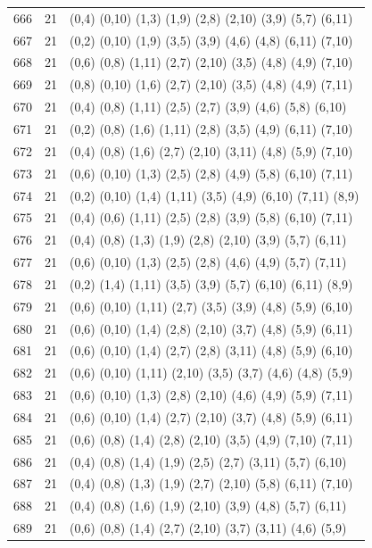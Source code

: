 {\begin{longtable}{lll}
666 & 21 & (0,4) (0,10) (1,3) (1,9) (2,8) (2,10) (3,9) (5,7) (6,11) \\
667 & 21 & (0,2) (0,10) (1,9) (3,5) (3,9) (4,6) (4,8) (6,11) (7,10) \\
668 & 21 & (0,6) (0,8) (1,11) (2,7) (2,10) (3,5) (4,8) (4,9) (7,10) \\
669 & 21 & (0,8) (0,10) (1,6) (2,7) (2,10) (3,5) (4,8) (4,9) (7,11) \\
670 & 21 & (0,4) (0,8) (1,11) (2,5) (2,7) (3,9) (4,6) (5,8) (6,10) \\
671 & 21 & (0,2) (0,8) (1,6) (1,11) (2,8) (3,5) (4,9) (6,11) (7,10) \\
672 & 21 & (0,4) (0,8) (1,6) (2,7) (2,10) (3,11) (4,8) (5,9) (7,10) \\
673 & 21 & (0,6) (0,10) (1,3) (2,5) (2,8) (4,9) (5,8) (6,10) (7,11) \\
674 & 21 & (0,2) (0,10) (1,4) (1,11) (3,5) (4,9) (6,10) (7,11) (8,9) \\
675 & 21 & (0,4) (0,6) (1,11) (2,5) (2,8) (3,9) (5,8) (6,10) (7,11) \\
676 & 21 & (0,4) (0,8) (1,3) (1,9) (2,8) (2,10) (3,9) (5,7) (6,11) \\
677 & 21 & (0,6) (0,10) (1,3) (2,5) (2,8) (4,6) (4,9) (5,7) (7,11) \\
678 & 21 & (0,2) (1,4) (1,11) (3,5) (3,9) (5,7) (6,10) (6,11) (8,9) \\
679 & 21 & (0,6) (0,10) (1,11) (2,7) (3,5) (3,9) (4,8) (5,9) (6,10) \\
680 & 21 & (0,6) (0,10) (1,4) (2,8) (2,10) (3,7) (4,8) (5,9) (6,11) \\
681 & 21 & (0,6) (0,10) (1,4) (2,7) (2,8) (3,11) (4,8) (5,9) (6,10) \\
682 & 21 & (0,6) (0,10) (1,11) (2,10) (3,5) (3,7) (4,6) (4,8) (5,9) \\
683 & 21 & (0,6) (0,10) (1,3) (2,8) (2,10) (4,6) (4,9) (5,9) (7,11) \\
684 & 21 & (0,6) (0,10) (1,4) (2,7) (2,10) (3,7) (4,8) (5,9) (6,11) \\
685 & 21 & (0,6) (0,8) (1,4) (2,8) (2,10) (3,5) (4,9) (7,10) (7,11) \\
686 & 21 & (0,4) (0,8) (1,4) (1,9) (2,5) (2,7) (3,11) (5,7) (6,10) \\
687 & 21 & (0,4) (0,8) (1,3) (1,9) (2,7) (2,10) (5,8) (6,11) (7,10) \\
688 & 21 & (0,4) (0,8) (1,6) (1,9) (2,10) (3,9) (4,8) (5,7) (6,11) \\
689 & 21 & (0,6) (0,8) (1,4) (2,7) (2,10) (3,7) (3,11) (4,6) (5,9) \\

\end{longtable}}
